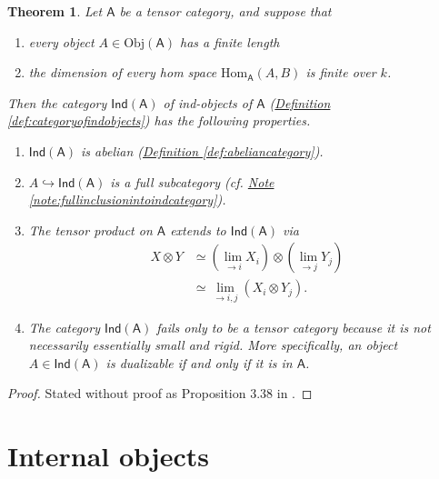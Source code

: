 \documentclass[a4paper,10pt]{scrreprt}
\newcommand{\Obj}{\mathrm{Obj}}
\newcommand{\Hom}{\mathrm{Hom}}
\theoremstyle{definition}
\theoremstyle{plain}
\newtheorem{theorem}{Theorem}[section]
\theoremstyle{remark}
\begin{document}
\begin{theorem}
  Let $\mathsf{A}$ be a tensor category, and suppose that
  \begin{enumerate}
    \item every object $A \in \Obj(\mathsf{A})$ has a finite length

    \item the dimension of every hom space $\Hom_{\mathsf{A}}(A, B)$ is finite over $k$.
  \end{enumerate}

  Then the category $\mathsf{Ind}(\mathsf{A})$ of ind-objects of $\mathsf{A}$ (\hyperref[def:categoryofindobjects]{Definition \ref*{def:categoryofindobjects}}) has the following properties.
  \begin{enumerate}
    \item $\mathsf{Ind}(\mathsf{A})$ is abelian (\hyperref[def:abeliancategory]{Definition \ref*{def:abeliancategory}}).

    \item $A \hookrightarrow \mathsf{Ind}(\mathsf{A})$ is a full subcategory (cf. \hyperref[note:fullinclusionintoindcategory]{Note \ref*{note:fullinclusionintoindcategory}}).

    \item The tensor product on $\mathsf{A}$ extends to $\mathsf{Ind}(\mathsf{A})$ via
      \begin{align*}
        X \otimes Y &\simeq (\lim_{\rightarrow i}X_{i}) \otimes (\lim_{\rightarrow j}Y_{j}) \\
        &\simeq \lim_{\rightarrow i,j} (X_{i} \otimes Y_{j}).
      \end{align*}

    \item The category $\mathsf{Ind}(\mathsf{A})$ fails only to be a tensor category because it is not necessarily essentially small and rigid. More specifically, an object $A \in \mathsf{Ind}(\mathsf{A})$ is dualizable if and only if it is in $\mathsf{A}$.
  \end{enumerate}
\end{theorem}
\begin{proof}
  Stated without proof as Proposition 3.38 in \cite{nlab-deligne-theorem}.
\end{proof}

\section{Internal objects}
\end{document}

